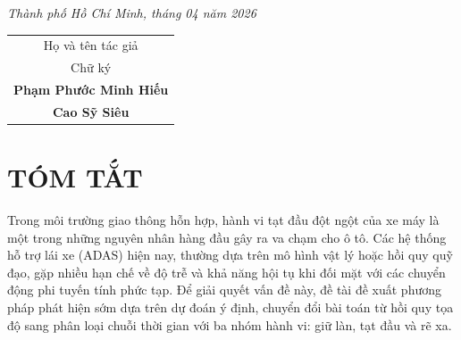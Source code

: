 \documentclass[12pt,a4paper]{report}
\begin{document}
	\vfill
	
	\begin{center}
		\textit{Thành phố Hồ Chí Minh, tháng 04 năm 2026}
	\end{center}
	
	\newpage
	\thispagestyle{empty}
	
	
	
	\vspace{1cm}
	
	\begin{flushright}
		\begin{tabular}{c}
			\textnormal{Họ và tên tác giả} \\
			\textnormal{Chữ ký} \\[2.5cm]
			\textbf{Phạm Phước Minh Hiếu} \\[2.5cm]
			\textbf{Cao Sỹ Siêu}
		\end{tabular}
	\end{flushright}
	
	\newpage
	\thispagestyle{empty}
	

	
	\clearpage
	\pagestyle{plain} 
	
	\tableofcontents
	
	
	
	\newpage
	\listoftables
	
	\newpage
	\listoffigures
	
	\clearpage
	\pagestyle{fancy} 
	\setlength{\parskip}{3pt}

	\chapter*{TÓM TẮT}
	Trong môi trường giao thông hỗn hợp, hành vi tạt đầu đột ngột của xe máy là một trong những nguyên nhân hàng đầu gây ra va chạm cho ô tô. Các hệ thống hỗ trợ lái xe (ADAS) hiện nay, thường dựa trên mô hình vật lý hoặc hồi quy quỹ đạo, gặp nhiều hạn chế về độ trễ và khả năng hội tụ khi đối mặt với các chuyển động phi tuyến tính phức tạp. Để giải quyết vấn đề này, đề tài đề xuất phương pháp phát hiện sớm dựa trên dự đoán ý định, chuyển đổi bài toán từ hồi quy tọa độ sang phân loại chuỗi thời gian với ba nhóm hành vi: giữ làn, tạt đầu và rẽ xa.
		
\end{document}
